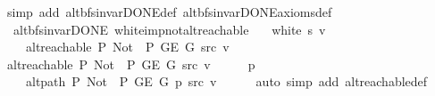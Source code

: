 \begin{isabellebody}
\ {\isacharparenleft}{\kern0pt}simp\ add{\isacharcolon}{\kern0pt}\ alt{\isacharunderscore}{\kern0pt}bfs{\isacharunderscore}{\kern0pt}invar{\isacharunderscore}{\kern0pt}DONE{\isacharunderscore}{\kern0pt}def\ alt{\isacharunderscore}{\kern0pt}bfs{\isacharunderscore}{\kern0pt}invar{\isacharunderscore}{\kern0pt}DONE{\isacharunderscore}{\kern0pt}axioms{\isacharunderscore}{\kern0pt}def{\isacharparenright}{\kern0pt}%
\endisatagproof
{\isafoldproof}%
%
\isadelimproof
\isanewline
%
\endisadelimproof
\isanewline
{}\isamarkupfalse%
\ {\isacharparenleft}{\kern0pt}\ alt{\isacharunderscore}{\kern0pt}bfs{\isacharunderscore}{\kern0pt}invar{\isacharunderscore}{\kern0pt}DONE{\isacharparenright}{\kern0pt}\ white{\isacharunderscore}{\kern0pt}imp{\isacharunderscore}{\kern0pt}not{\isacharunderscore}{\kern0pt}alt{\isacharunderscore}{\kern0pt}reachable{\isacharcolon}{\kern0pt}\isanewline
\ \ \ {\isachardoublequoteopen}white\ s\ v{\isachardoublequoteclose}\isanewline
\ \ \ {\isachardoublequoteopen}{\isasymnot}\ alt{\isacharunderscore}{\kern0pt}reachable\ P{\isacharprime}{\kern0pt}{\isacharprime}{\kern0pt}\ {\isacharparenleft}{\kern0pt}Not\ {\isasymcirc}\ P{\isacharprime}{\kern0pt}{\isacharprime}{\kern0pt}{\isacharparenright}{\kern0pt}\ {\isacharparenleft}{\kern0pt}G{\isachardot}{\kern0pt}E\ G{\isacharparenright}{\kern0pt}\ src\ v{\isachardoublequoteclose}\isanewline
%
\isadelimproof
%
\endisadelimproof
%
\isatagproof
{}\isamarkupfalse%
\isanewline
\ \ \isamarkupfalse%
\ {\isachardoublequoteopen}alt{\isacharunderscore}{\kern0pt}reachable\ P{\isacharprime}{\kern0pt}{\isacharprime}{\kern0pt}\ {\isacharparenleft}{\kern0pt}Not\ {\isasymcirc}\ P{\isacharprime}{\kern0pt}{\isacharprime}{\kern0pt}{\isacharparenright}{\kern0pt}\ {\isacharparenleft}{\kern0pt}G{\isachardot}{\kern0pt}E\ G{\isacharparenright}{\kern0pt}\ src\ v{\isachardoublequoteclose}\isanewline
\ \ \isamarkupfalse%
\ \isamarkupfalse%
\ p\ \isanewline
\ \ \ \ {\isachardoublequoteopen}alt{\isacharunderscore}{\kern0pt}path\ P{\isacharprime}{\kern0pt}{\isacharprime}{\kern0pt}\ {\isacharparenleft}{\kern0pt}Not\ {\isasymcirc}\ P{\isacharprime}{\kern0pt}{\isacharprime}{\kern0pt}{\isacharparenright}{\kern0pt}\ {\isacharparenleft}{\kern0pt}G{\isachardot}{\kern0pt}E\ G{\isacharparenright}{\kern0pt}\ p\ src\ v{\isachardoublequoteclose}\isanewline
\ \ \ \ \isamarkupfalse%
\ {\isacharparenleft}{\kern0pt}auto\ simp\ add{\isacharcolon}{\kern0pt}\ alt{\isacharunderscore}{\kern0pt}reachable{\isacharunderscore}{\kern0pt}def{\isacharparenright}{\kern0pt}\isanewline

\end{isabellebody}
